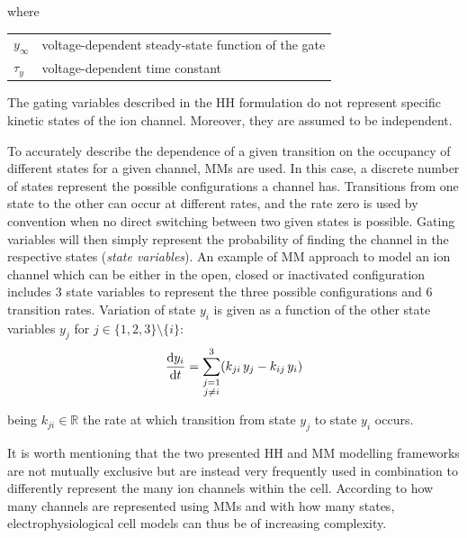 \noindent
where

\vspace{0.5cm}
\begin{tabular}{ll}
$y_{\infty}$ & voltage-dependent steady-state function of the gate \\
$\tau_{y}$ & voltage-dependent time constant
\end{tabular}

\vspace{0.5cm}
\noindent
The gating variables described in the HH formulation do not represent specific kinetic states of the ion channel. Moreover, they are assumed to be independent.

\vspace{0.2cm}
To accurately describe the dependence of a given transition on the occupancy of different states for a given channel, MMs are used. In this case, a discrete number of states represent the possible configurations a channel has. Transitions from one state to the other can occur at different rates, and the rate zero is used by convention when no direct switching between two given states is possible. Gating variables will then simply represent the probability of finding the channel in the respective states (\textit{state variables}). An example of MM approach to model an ion channel which can be either in the open, closed or inactivated configuration includes $3$ state variables to represent the three possible configurations and $6$ transition rates. Variation of state $y_i$ is given as a function of the other state variables $y_j$ for $j\in\{1,2,3\}\setminus{\{i\}}$:
%
\begin{equation}
    \dfrac{\mathrm{d}{y_i}}{\mathrm{d}{t}} = \sum_{\substack{j=1 \\ j\neq i}}^{3} (k_{ji}\,y_j-k_{ij}\,y_i)
\end{equation}

\noindent
being $k_{ji}\in\mathbb{R}$ the rate at which transition from state $y_j$ to state $y_i$ occurs.

\vspace{0.5cm}
It is worth mentioning that the two presented HH and MM modelling frameworks are not mutually exclusive but are instead very frequently used in combination to differently represent the many ion channels within the cell. According to how many channels are represented using MMs and with how many states, electrophysiological cell models can thus be of increasing complexity.



